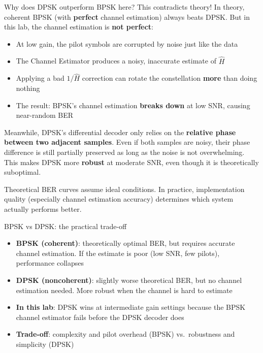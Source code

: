 \begin{IntuitionBox}{Why does DPSK outperform BPSK here? This contradicts theory!}
In theory, coherent BPSK (with \textbf{perfect} channel estimation) always beats DPSK. But in this lab, the channel estimation is \textbf{not perfect}:

\begin{itemize}
\item At low gain, the pilot symbols are corrupted by noise just like the data
\item The Channel Estimator produces a noisy, inaccurate estimate of $\hat{H}$
\item Applying a bad $1/\hat{H}$ correction can rotate the constellation \textbf{more} than doing nothing
\item The result: BPSK's channel estimation \textbf{breaks down} at low SNR, causing near-random BER
\end{itemize}

\vspace{0.3cm}

Meanwhile, DPSK's differential decoder only relies on the \textbf{relative phase between two adjacent samples}. Even if both samples are noisy, their phase difference is still partially preserved as long as the noise is not overwhelming. This makes DPSK more \textbf{robust} at moderate SNR, even though it is theoretically suboptimal.

\vspace{0.3cm}

Theoretical BER curves assume ideal conditions. In practice, implementation quality (especially channel estimation accuracy) determines which system actually performs better.
\end{IntuitionBox}

\begin{KeyBox}{BPSK vs DPSK: the practical trade-off}
\begin{itemize}
\item \textbf{BPSK (coherent)}: theoretically optimal BER, but requires accurate channel estimation. If the estimate is poor (low SNR, few pilots), performance collapses
\item \textbf{DPSK (noncoherent)}: slightly worse theoretical BER, but no channel estimation needed. More robust when the channel is hard to estimate
\item \textbf{In this lab}: DPSK wins at intermediate gain settings because the BPSK channel estimator fails before the DPSK decoder does
\item \textbf{Trade-off}: complexity and pilot overhead (BPSK) vs.\ robustness and simplicity (DPSK)
\end{itemize}
\end{KeyBox}

